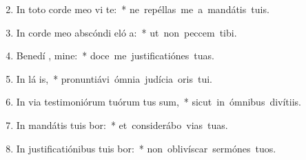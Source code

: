 \begin{flushleft}
\begin{enumerate}[leftmargin=*]
\setcounter{enumi}{1}

\item In toto corde meo vi te:~* \mbox{ne repéllas me a mandátis tuis.}
\item In corde meo abscóndi eló a:~* \mbox{ut non peccem tibi.}
\item Benedí , mine:~* \mbox{doce me justificatiónes tuas.}
\item In lá is,~* \mbox{pronuntiávi ómnia judícia oris tui.}
\item In via testimoniórum tuórum tus sum,~* \mbox{sicut in ómnibus divítiis.}
\item In mandátis tuis bor:~* \mbox{et considerábo vias tuas.}
\item In justificatiónibus tuis bor:~* \mbox{non oblivíscar sermónes tuos.}


\end{enumerate}
\end{flushleft}


